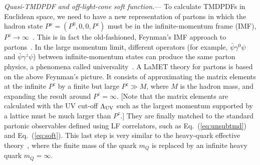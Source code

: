 \documentclass[twocolumn,aps,prd,preprintnumbers,superscriptaddress,10pt]{revtex4-1}
\begin{document}
\vspace{0.2cm}


{\it Quasi-TMDPDF and off-light-cone soft function.}---
To calculate TMDPDFs in Euclidean space, we need to have a new representation
of partons in which the hadron state $P^\mu=(P^0,0,0,P^z)$ must be in the infinite-momentum frame (IMF), $P^z\to\infty$~\cite{Ji:2014gla,Ji:2020byp}. This is
in fact the old-fashioned, Feynman's IMF approach to partons~\cite{Feynman:1973xc}.
In the large momentum limit, different operators (for example, $\bar\psi\gamma^0\psi$ and $\bar\psi\gamma^z\psi$) between infinite-momentum states can produce
the same parton physics, a phenomena called universality~\cite{Ji:2014gla,Hatta:2013gta}.
A LaMET theory for partons is based on the above Feynman's picture. It
consists of approximating the matrix elements at the infinite $P^z$ by a finite but large $P^z\gg M$,
where $M$ is the hadron mass, and expanding the result around $P^z=\infty$. [Note that the matrix elements
are calculated with the UV cut-off $\Lambda_{\rm UV}$ such as the largest momentum supported by
a lattice must be much larger than $P^z$.] They are finally matched
to the standard partonic observables defined using LF correlators, such as Eq.~(\ref{eq:unsubtmd}) and Eq.~(\ref{eq:soft}). This last step is very similar to the heavy-quark effective theory~\cite{Manohar:2000dt}, where the finite
mass of the quark $m_Q$ is replaced by an infinite heavy quark $m_Q=\infty$.
\end{document}
